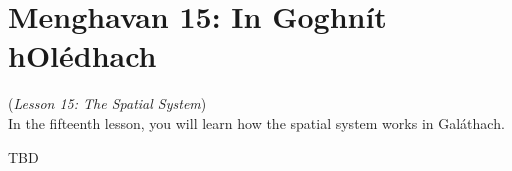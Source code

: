 \section{Menghavan 15: In Goghn\'{i}t hOl\'{e}dhach}
(\textit{Lesson 15: The Spatial System})\\

In the fifteenth lesson, you will learn how the spatial system works in Gal\'{a}thach.

TBD
